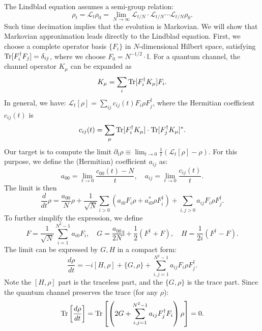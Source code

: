 \documentclass{SciPost}
\begin{document}
The Lindblad equation assumes a semi-group relation: 
\begin{equation}
	\rho_t = \mathcal{L}_t \rho_0 = \lim_{N \rightarrow \infty} \mathcal{L}_{t/N}\cdot\mathcal{L}_{t/N}\cdots \mathcal{L}_{t/N}\rho_0.
\end{equation}
Such time decimation implies that the evolution is Markovian. We will show that Markovian approximation leads directly to the Lindblad equation. First, we choose a complete operator basis $\{F_i\}$ in $N$-dimensional Hilbert space, satisfying $\operatorname{Tr}[F_i^\dagger F_j] = \delta_{ij}$, where we choose $F_0=N^{-1/2} \cdot\mathbb I$. For a quantum channel, the channel operator $K_\mu$ can be expanded as 
\begin{equation}
	K_\mu = \sum_i \operatorname{Tr}[F_i^\dagger K_\mu]F_i.
\end{equation}
In general, we have: $\mathcal{L}_t[\rho] = \sum_{ij}c_{ij}(t)F_i\rho F_j^\dagger$, where the Hermitian coefficient $c_{ij}(t)$ is 
\begin{equation}
	c_{ij}(t) = \sum_{\mu} \operatorname{Tr}[F_i^\dagger K_\mu]\cdot \operatorname{Tr}[F_j^\dagger K_\mu]^*.
\end{equation}
Our target is to compute the limit $\partial_t \rho \equiv \lim_{t\rightarrow 0} \frac{1}{t}(\mathcal{L}_t[\rho]-\rho)$.
For this purpose, we define the (Hermitian) coefficient $a_{ij}$ as:
\begin{equation*}
	a_{00} = \lim_{t\rightarrow 0} \frac{c_{00}(t)-N}{t}, \quad
	a_{ij} = \lim_{t\rightarrow 0} \frac{c_{ij}(t)}{t}.
\end{equation*}
The limit is then
$$
	\frac{d}{dt}\rho 
	= \frac{a_{00}}{N}\rho + \frac{1}{\sqrt N} \sum_{i>0} \left(a_{i0} F_i \rho + a_{i0}^*\rho F_i^\dagger\right) + \sum_{i,j>0} a_{ij} F_i \rho F_j^\dagger. 
$$
To further simplify the expression, we define
\begin{equation*}
	F = \frac{1}{\sqrt N} \sum_{i=1}^{N^2-1} a_{i0} F_i, \quad
	G = \frac{a_{00}}{2N}\mathbb I +\frac{1}{2}(F^\dagger+F), \quad
	H = \frac{1}{2i}(F^\dagger-F).
\end{equation*}
The limit can be expressed by $G,H$ in a compact form:
\begin{equation*}
	\frac{d\rho}{dt} = -i[H,\rho]+\{G, \rho\}+\sum_{i,j=1}^{N^2-1}a_{ij}F_i\rho F_j^\dagger.
\end{equation*}
Note the $[H,\rho]$ part is the traceless part, and the $\{G,\rho\}$ is the trace part. Since the quantum channel preserves the trace (for any $\rho$):
$$
\operatorname{Tr}\left[\frac{d\rho}{dt}\right]= \operatorname{Tr}\left[ \left(2G+\sum_{i,j=1}^{N^2-1}a_{ij}F_j^\dagger F_i \right)\rho \right]=0.
$$
\end{document}
